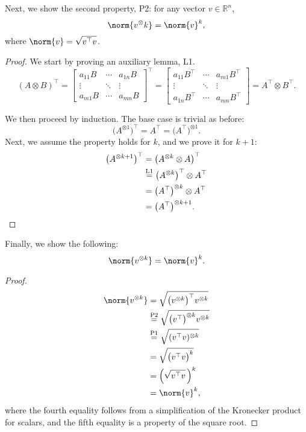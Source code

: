\documentclass[11pt]{article}
\newcommand{\kp}{\otimes} %
\begin{document}
Next, we show the second property, P2: for any vector \(v \in \mathbb{R}^n\),
\[
\norm{v^\kp k} = \norm{v}^{k},
\]
where \(\norm{v} = \sqrt{v^\top v}\).
\begin{proof}
We start by proving an auxiliary lemma, L1.
\[
(A \kp B)^\top = \begin{bmatrix}
a_{11} B & \cdots & a_{1n}B \\
\vdots & \ddots & \vdots \\
a_{m1} B & \cdots & a_{mn} B
\end{bmatrix}^\top = \begin{bmatrix}
a_{11} B^\top & \cdots & a_{m1}B^\top \\
\vdots & \ddots & \vdots \\
a_{1n} B^\top & \cdots & a_{mn} B^\top
\end{bmatrix} = A^\top \kp B^\top.
\]

We then proceed by induction.
The base case is trivial as before:
\[
\big(A^{\kp 1}\big)^\top = A^\top = \big(A^\top\big)^{\kp 1}.
\]
Next, we assume the property holds for $k$, and we prove it for $k+1$:
\begin{align*}
\big(A^{\kp k+1}\big)^\top &= \big(A^{\kp k} \kp A\big)^\top\\
&\overset{\textnormal{L1}}{=} \big(A^{\kp k}\big)^\top \kp A^\top\\
&= \big(A^\top\big)^{\kp k} \kp A^\top\\
&= \big(A^\top\big)^{\kp k+1}.\qedhere
\end{align*}
\end{proof}

Finally, we show the following:
\[
\norm{v^{\kp k}} = \norm{v}^k.
\]
\begin{proof}
\begin{align*}
\norm{v^{\kp k}} &= \sqrt{\big(v^{\kp k}\big)^\top v^{\kp k}}\\
&\overset{\textnormal{P2}}{=} \sqrt{\big(v^\top\big)^{\kp k} v^{\kp k}}\\
&\overset{\textnormal{P1}}{=} \sqrt{(v^\top v)^{\kp k}}\\
&= \sqrt{\big(v^\top v\big)^k}\\
&= \Big(\sqrt{v^\top v}\,\Big)^k\\
&= \norm{v}^k,
\end{align*}
where the fourth equality follows from a simplification of the Kronecker product for scalars, and the fifth equality is a property of the square root.
\end{proof}
\end{document}
